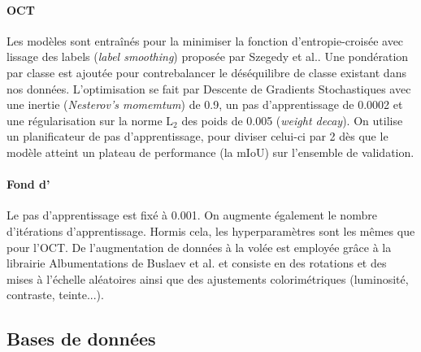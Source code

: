 \paragraph{OCT} Les modèles sont entraînés pour la minimiser la fonction d'entropie-croisée avec lissage des labels (\textit{label smoothing}) proposée par Szegedy et al.\cite{szegedyRethinkingInceptionArchitecture2016}. Une pondération par classe est ajoutée pour contrebalancer le déséquilibre de classe existant dans nos données. L'optimisation se fait par Descente de Gradients Stochastiques avec une inertie (\textit{Nesterov's momemtum}) de 0.9, un pas d'apprentissage de 0.0002 et une régularisation sur la norme $\text{L}_2$ des poids de 0.005 (\textit{weight decay}). On utilise un planificateur de pas d'apprentissage, pour diviser celui-ci par 2 dès que le modèle atteint un plateau de performance (la \acl{mIoU}) sur l'ensemble de validation. 

\paragraph{Fond d'\oeil} Le pas d'apprentissage est fixé à 0.001. On augmente également le nombre d'itérations d'apprentissage. Hormis cela, les hyperparamètres sont les mêmes que pour l'OCT. De l'augmentation de données à la volée est employée grâce à la librairie Albumentations de Buslaev et al. \cite{info11020125} et consiste en des rotations et des mises à l'échelle aléatoires ainsi que des ajustements colorimétriques (luminosité, contraste, teinte...).

\subsection{Bases de données}
\label{sec:databaseFocusedAttention}
